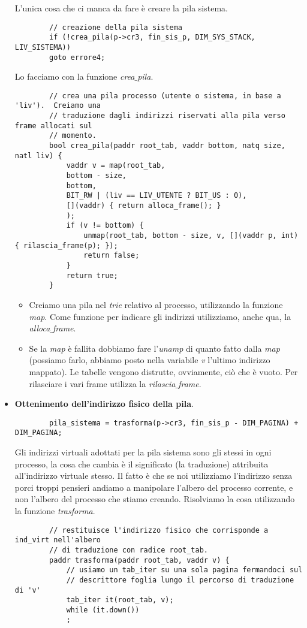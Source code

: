 \begin{itemize}
	L'unica cosa che ci manca da fare è creare la pila sistema.
	\small 
	\begin{verbatim}
		// creazione della pila sistema
		if (!crea_pila(p->cr3, fin_sis_p, DIM_SYS_STACK, LIV_SISTEMA))
		goto errore4;
	\end{verbatim}
	\normalsize 
	Lo facciamo con la funzione  \emph{crea$\_$pila}.
	\small
	\begin{verbatim}
		// crea una pila processo (utente o sistema, in base a 'liv').  Creiamo una
		// traduzione dagli indirizzi riservati alla pila verso frame allocati sul
		// momento.
		bool crea_pila(paddr root_tab, vaddr bottom, natq size, natl liv) {
			vaddr v = map(root_tab,
			bottom - size,
			bottom,
			BIT_RW | (liv == LIV_UTENTE ? BIT_US : 0),
			[](vaddr) { return alloca_frame(); }
			);
			if (v != bottom) {
				unmap(root_tab, bottom - size, v, [](vaddr p, int) { rilascia_frame(p); });
				return false;
			}
			return true;
		}
	\end{verbatim}
	\normalsize 
	\begin{itemize}
		\item Creiamo una pila nel \emph{trie} relativo al processo, utilizzando la funzione \emph{map}. Come funzione per indicare gli indirizzi utilizziamo, anche qua, la \emph{alloca$\_$frame}.
		\item Se la \emph{map} è fallita dobbiamo fare l'\emph{unamp} di quanto fatto dalla \emph{map} (possiamo farlo, abbiamo posto nella variabile \emph{v} l'ultimo indirizzo mappato). Le tabelle vengono distrutte, ovviamente, ciò che è vuoto. Per rilasciare i vari frame utilizza la \emph{rilascia$\_$frame}.
	\end{itemize}
	
	\item \textbf{Ottenimento dell'indirizzo fisico della pila}.
	\small 
	\begin{verbatim}
		pila_sistema = trasforma(p->cr3, fin_sis_p - DIM_PAGINA) + DIM_PAGINA;
	\end{verbatim}
	\normalsize 
	Gli indirizzi virtuali adottati per la pila sistema sono gli stessi in ogni processo, la cosa che cambia è il significato (la traduzione) attribuita all'indirizzo virtuale stesso. Il fatto è che se noi utilizziamo l'indirizzo senza porci troppi pensieri andiamo a manipolare l'albero del processo corrente, e non l'albero del processo che stiamo creando. Risolviamo la cosa utilizzando la funzione \emph{trasforma}.
	\small
	\begin{verbatim}
		// restituisce l'indirizzo fisico che corrisponde a ind_virt nell'albero
		// di traduzione con radice root_tab.
		paddr trasforma(paddr root_tab, vaddr v) {
			// usiamo un tab_iter su una sola pagina fermandoci sul
			// descrittore foglia lungo il percorso di traduzione di 'v'
			tab_iter it(root_tab, v);
			while (it.down())
			;
			

\end{verbatim}
\end{itemize}

